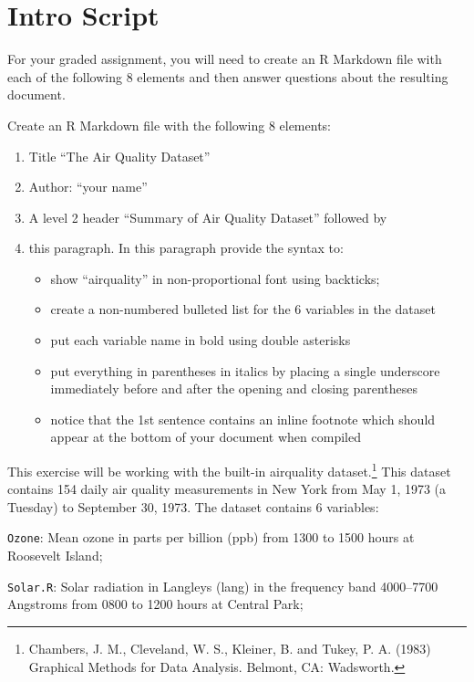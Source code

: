 \documentclass[]{book}
\providecommand{\tightlist}{%
  \setlength{\itemsep}{0pt}\setlength{\parskip}{0pt}}
\let\rmarkdownfootnote\footnote%
\def\footnote{\protect\rmarkdownfootnote}
\theoremstyle{definition}
\theoremstyle{definition}
\theoremstyle{definition}
\theoremstyle{remark}
\begin{document}
\section{Intro Script}\label{intro-script-2}

For your graded assignment, you will need to create an R Markdown file
with each of the following 8 elements and then answer questions about
the resulting document.

Create an R Markdown file with the following 8 elements:

\begin{enumerate}
\def\labelenumi{\arabic{enumi}.}
\item
  Title ``The Air Quality Dataset''
\item
  Author: ``your name''
\item
  A level 2 header ``Summary of Air Quality Dataset'' followed by
\item
  this paragraph. In this paragraph provide the syntax to:

  \begin{itemize}
  \tightlist
  \item
    show ``airquality'' in non-proportional font using backticks;
  \item
    create a non-numbered bulleted list for the 6 variables in the
    dataset
  \item
    put each variable name in bold using double asterisks
  \item
    put everything in parentheses in italics by placing a single
    underscore immediately before and after the opening and closing
    parentheses
  \item
    notice that the 1st sentence contains an inline footnote which
    should appear at the bottom of your document when compiled
  \end{itemize}
\end{enumerate}

This exercise will be working with the built-in airquality
dataset.\footnote{Chambers, J. M., Cleveland, W. S., Kleiner, B. and
  Tukey, P. A. (1983) Graphical Methods for Data Analysis. Belmont, CA:
  Wadsworth.} This dataset contains 154 daily air quality measurements
in New York from May 1, 1973 (a Tuesday) to September 30, 1973. The
dataset contains 6 variables:

\texttt{Ozone}: Mean ozone in parts per billion (ppb) from 1300 to 1500
hours at Roosevelt Island;

\texttt{Solar.R}: Solar radiation in Langleys (lang) in the frequency
band 4000--7700 Angstroms from 0800 to 1200 hours at Central Park;
\end{document}
